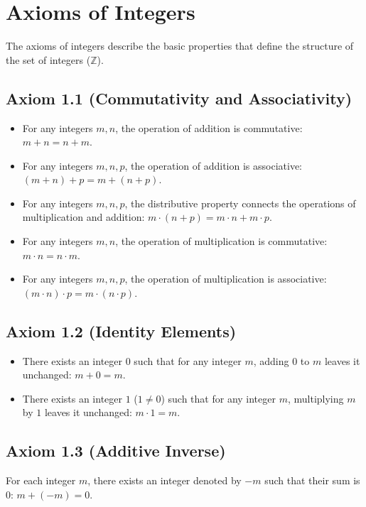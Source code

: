 \section*{Axioms of Integers}

The axioms of integers describe the basic properties that define the structure of the set of integers (\(\mathbb{Z}\)).

\subsection*{Axiom 1.1 (Commutativity and Associativity)}
\begin{itemize}
  \item For any integers \(m, n\), the operation of addition is commutative: \(m + n = n + m\).
  \item For any integers \(m, n, p\), the operation of addition is associative: \((m + n) + p = m + (n + p)\).
  \item For any integers \(m, n, p\), the distributive property connects the operations of multiplication and addition: \(m \cdot (n + p) = m \cdot n + m \cdot p\).
  \item For any integers \(m, n\), the operation of multiplication is commutative: \(m \cdot n = n \cdot m\).
  \item For any integers \(m, n, p\), the operation of multiplication is associative: \((m \cdot n) \cdot p = m \cdot (n \cdot p)\).
\end{itemize}

\subsection*{Axiom 1.2 (Identity Elements)}
\begin{itemize}
  \item There exists an integer \(0\) such that for any integer \(m\), adding \(0\) to \(m\) leaves it unchanged: \(m + 0 = m\).
  \item There exists an integer \(1\) (\(1 \neq 0\)) such that for any integer \(m\), multiplying \(m\) by \(1\) leaves it unchanged: \(m \cdot 1 = m\).
\end{itemize}

\subsection*{Axiom 1.3 (Additive Inverse)}
For each integer \(m\), there exists an integer denoted by \(-m\) such that their sum is \(0\): \(m + (-m) = 0\).

